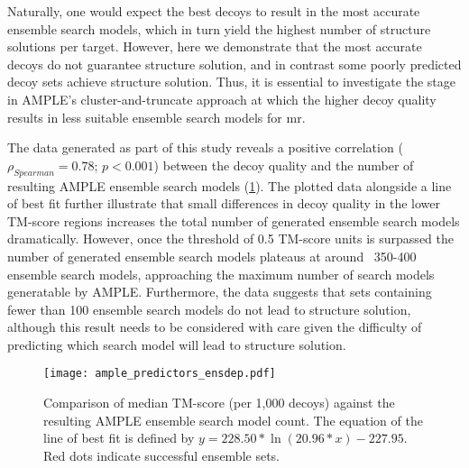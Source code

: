 Naturally, one would expect the best decoys to result in the most accurate ensemble search models, which in turn yield the highest number of structure solutions per target. However, here we demonstrate that the most accurate decoys do not guarantee structure solution, and in contrast some poorly predicted decoy sets achieve structure solution. Thus, it is essential to investigate the stage in AMPLE's cluster-and-truncate approach at which the higher decoy quality results in less suitable ensemble search models for \gls{mr}.

The data generated as part of this study reveals a positive correlation ($\rho_{Spearman}=0.78$; $p<0.001$) between the decoy quality and the number of resulting AMPLE ensemble search models (\cref{fig:ample_predictor_ensdep}). The plotted data alongside a line of best fit further illustrate that small differences in decoy quality in the lower TM-score regions increases the total number of generated ensemble search models dramatically. However, once the threshold of 0.5 TM-score units \cite{Xu2010-kr} is surpassed the number of generated ensemble search models plateaus at around ~350-400 ensemble search models, approaching the maximum number of search models generatable by AMPLE. Furthermore, the data suggests that sets containing fewer than 100 ensemble search models do not lead to structure solution, although this result needs to be considered with care given the difficulty of predicting which search model will lead to structure solution.

\begin{figure}[H]
    \centering
    \texttt{[image: ample\_predictors\_ensdep.pdf]}
    \caption[Relationship between median TM-score and search model size of AMPLE ensembles]{Comparison of median TM-score (per 1,000 decoys) against the resulting AMPLE ensemble search model count. The equation of the line of best fit is defined by $y=228.50*\ln\left(20.96*x\right)-227.95$. Red dots indicate successful ensemble sets.}
    \label{fig:ample_predictor_ensdep}
\end{figure}

